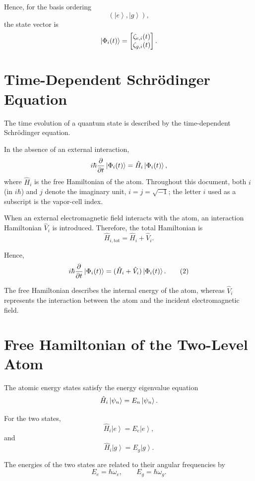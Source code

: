 \documentclass[12pt,a4paper]{article}
\newcommand{\ketg}{\left|g\right\rangle}
\newcommand{\kete}{\left|e\right\rangle}
\begin{document}
Hence, for the basis ordering
\[
(\kete,\ketg),
\]
the state vector is
\[
\ket{\Phi_i(t)}
=
\begin{bmatrix}
\zeta_{e,i}(t)\\
\zeta_{g,i}(t)
\end{bmatrix}.
\]



\section{Time-Dependent Schr\"odinger Equation}

The time evolution of a quantum state is described by the
time-dependent Schr\"odinger equation.

In the absence of an external interaction,
\[
i\hbar
\frac{\partial}{\partial t}
\ket{\Phi_i(t)}
=
\hat H_i
\ket{\Phi_i(t)},
\]
where \(\hat H_i\) is the free Hamiltonian of the atom. Throughout this
document, both \(i\) (in \(i\hbar\)) and \(j\) denote the imaginary unit,
\(i=j=\sqrt{-1}\); the letter \(i\) used as a subscript is the vapor-cell index.

When an external electromagnetic field interacts with the atom,
an interaction Hamiltonian \(\hat V_i\) is introduced. Therefore,
the total Hamiltonian is
\[
\hat H_{i,\mathrm{tot}}
=
\hat H_i+\hat V_i.
\]

Hence,
\begin{equation}
i\hbar
\frac{\partial}{\partial t}
\ket{\Phi_i(t)}
=
(\hat H_i+\hat V_i)
\ket{\Phi_i(t)}.
\tag{2}
\end{equation}

The free Hamiltonian describes the internal energy of the atom,
whereas \(\hat V_i\) represents the interaction between the atom
and the incident electromagnetic field.

\section{Free Hamiltonian of the Two-Level Atom}

The atomic energy states satisfy the energy eigenvalue equation
\[
\hat H_i\ket{\psi_n}
=
E_n\ket{\psi_n}.
\]

For the two states,
\[
\hat H_i\kete
=
E_e\kete,
\]
and
\[
\hat H_i\ketg
=
E_g\ketg.
\]

The energies of the two states are related to their angular
frequencies by
\[
E_e=\hbar\omega_e,
\qquad
E_g=\hbar\omega_g.
\]
\end{document}
